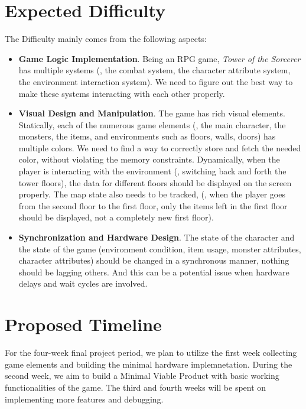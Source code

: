 \documentclass{article}
\begin{document}
\section{Expected Difficulty}
The Difficulty mainly comes from the following aspects:
\begin{itemize}
    \item \textbf{Game Logic Implementation}. Being an RPG game, \textit{Tower of the Sorcerer} has multiple systems (\eg, the combat system, the character attribute system, the environment interaction system). We need to figure out the best way to make these systems interacting with each other properly.
    \item \textbf{Visual Design and Manipulation}. The game has rich visual elements. Statically, each of the numerous game elements (\eg, the main character, the monsters, the items, and environments such as floors, walls, doors) has multiple colors. We need to find a way to correctly store and fetch the needed color, without violating the memory constraints. Dynamically, when the player is interacting with the environment (\eg, switching back and forth the tower floors), the data for different floors should be displayed on the screen properly. The map state also needs to be tracked, (\eg, when the player goes from the second floor to the first floor, only the items left in the first floor should be displayed, not a completely new first floor).
    \item \textbf{Synchronization and Hardware Design}. The state of the character and the state of the game (\eg environment condition, item usage, monster attributes, character attributes) should be changed in a synchronous manner, \ie nothing should be lagging others. And this can be a potential issue when hardware delays and wait cycles are involved.
\end{itemize}

\section{Proposed Timeline}
For the four-week final project period, we plan to utilize the first week collecting game elements and building the minimal hardware implemnetation. During the second week, we aim to build a Minimal Viable Product with basic working functionalities of the game. The third and fourth weeks will be spent on implementing more features and debugging.
\end{document}
